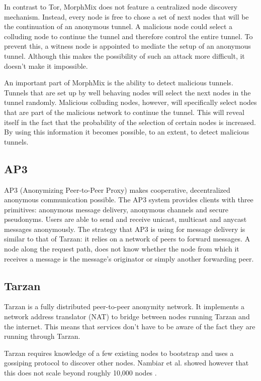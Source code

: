 \documentclass{article}
\begin{document}
		In contrast to Tor, MorphMix does not feature a centralized node discovery mechanism. Instead, every node is free to chose a set of next nodes that will be the continuation of an anonymous tunnel. A malicious node could select a colluding node to continue the tunnel and therefore control the entire tunnel. To prevent this, a witness node is appointed to mediate the setup of an anonymous tunnel. Although this makes the possibility of such an attack more difficult, it doesn't make it impossible.
		
		An important part of MorphMix is the ability to detect malicious tunnels. Tunnels that are set up by well behaving nodes will select the next nodes in the tunnel randomly. Malicious colluding nodes, however, will specifically select nodes that are part of the malicious network to continue the tunnel. This will reveal itself in the fact that the probability of the selection of certain nodes is increased. By using this information it becomes possible, to an extent, to detect malicious tunnels.
		
	\subsection{AP3} %
		AP3 (Anonymizing Peer-to-Peer Proxy) \cite{mislove2004ap3} makes cooperative, decentralized anonymous communication possible. The AP3 system provides clients with three primitives: anonymous message delivery, anonymous channels and secure pseudonyms. Users are able to send and receive unicast, multicast and anycast messages anonymously. The strategy that AP3 is using for message delivery is similar to that of Tarzan: it relies on a network of peers to forward messages. A node along the request path, does not know whether the node from which it receives a message is the message's originator or simply another forwarding peer.
		
	\subsection{Tarzan} %
		Tarzan \cite{freedman2002tarzan} is a fully distributed peer-to-peer anonymity network. It implements a network address translator (NAT) to bridge between nodes running Tarzan and the internet. This means that services don't have to be aware of the fact they are running through Tarzan.
		
		Tarzan requires knowledge of a few existing nodes to bootstrap and uses a gossiping protocol to discover other nodes. Nambiar et al. showed however that this does not scale beyond roughly 10,000 nodes \cite{panchenko2009nisan, nambiar2006salsa}.
		
\end{document}
